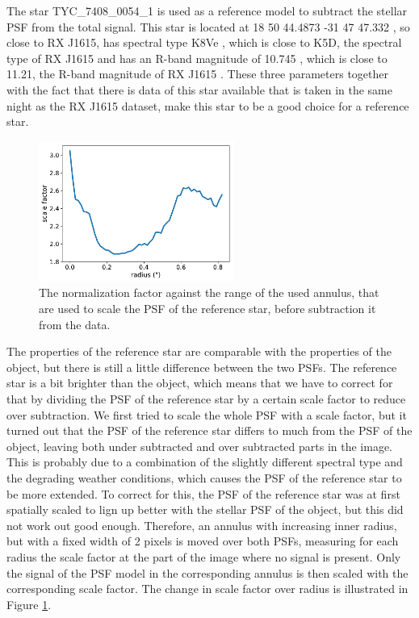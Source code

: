 \documentclass[twoside,single]{lion-msc}
\begin{document}
The star TYC\_7408\_0054\_1 is used as a reference model to subtract the stellar PSF from the total signal. This star is located at 18 50 44.4873 -31 47 47.332 \cite{Gaia2016}, so close to RX J1615, has spectral type K8Ve \cite{Torres2006}, which is close to K5D, the spectral type of RX J1615 \cite{Krautter1997} and has an R-band magnitude of 10.745 \cite{Gaia2016}, which is close to 11.21, the R-band magnitude of RX J1615 \cite{Makarov2007}. These three parameters together with the fact that there is data of this star available that is taken in the same night as the RX J1615 dataset, make this star to be a good choice for a reference star.
\bigskip

\begin{figure}
\centering
\includegraphics[width = 0.57\textwidth]{normfac}
\caption{The normalization factor against the range of the used annulus, that are used to scale the PSF of the reference star, before subtraction it from the data.}
\label{fig:rdinorm}
\vspace{-5mm}
\end{figure}

The properties of the reference star are comparable with the properties of the object, but there is still a little difference between the two PSFs. The reference star is a bit brighter than the object, which means that we have to correct for that by dividing the PSF of the reference star by a certain scale factor to reduce over subtraction. We first tried to scale the whole PSF with a scale factor, but it turned out that the PSF of the reference star differs to much from the PSF of the object, leaving both under subtracted and over subtracted parts in the image. This is probably due to a combination of the slightly different spectral type and the degrading weather conditions, which causes the PSF of the reference star to be more extended. To correct for this, the PSF of the reference star was at first spatially scaled to lign up better with the stellar PSF of the object, but this did not work out good enough. Therefore, an annulus with increasing inner radius, but with a fixed width of 2 pixels is moved over both PSFs, measuring for each radius the scale factor at the part of the image where no signal is present. Only the signal of the PSF model in the corresponding annulus is then scaled with the corresponding scale factor. The change in scale factor over radius is illustrated in Figure \ref{fig:rdinorm}.
\end{document}
